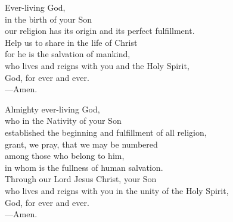 \prayer

\begin{prayerverse}

Ever-living God,\\
in the birth of your Son\\
our religion has its origin and its perfect fulfillment.\\
Help us to share in the life of Christ\\
for he is the salvation of mankind,\\
who lives and reigns with you and the Holy Spirit,\\
God, for ever and ever.\\
{\color{red}---\thinspace}Amen.

\end{prayerverse}


\begin{prayerverse}

Almighty ever-living God,\\
who in the Nativity of your Son\\
established the beginning and fulfillment of all religion,\\
grant, we pray, that we may be numbered\\
among those who belong to him,\\
in whom is the fullness of human salvation.\\
Through our Lord Jesus Christ, your Son\\
who lives and reigns with you in the unity of the Holy Spirit,\\
God, for ever and ever.\\
{\color{red}---\thinspace}Amen.

\end{prayerverse}